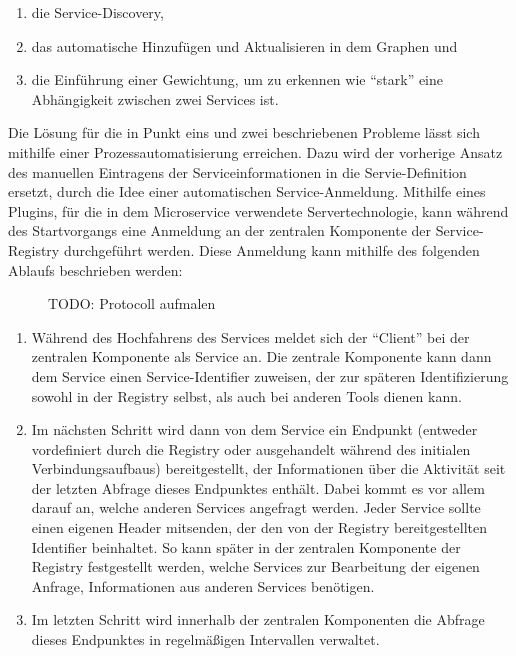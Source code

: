 \begin{enumerate}
	\item die Service-Discovery,
	\item das automatische Hinzufügen und Aktualisieren in dem Graphen und
	\item die Einführung einer Gewichtung, um zu erkennen wie \enquote{stark} eine Abhängigkeit zwischen zwei Services ist.
\end{enumerate}

Die Lösung für die in Punkt eins und zwei beschriebenen Probleme lässt sich mithilfe einer Prozessautomatisierung erreichen. Dazu wird der vorherige Ansatz des manuellen Eintragens der Serviceinformationen in die Servie-Definition ersetzt, durch die Idee einer automatischen Service-Anmeldung. Mithilfe eines Plugins, für die in dem Microservice verwendete Servertechnologie, kann während des Startvorgangs eine Anmeldung an der zentralen Komponente der Service-Registry durchgeführt werden. Diese Anmeldung kann mithilfe des folgenden Ablaufs beschrieben werden:

\begin{figure}[h]
	\centering
	
	\caption{TODO: Protocoll aufmalen}
\end{figure}

\begin{enumerate}
	\item Während des Hochfahrens des Services meldet sich der \enquote{Client} bei der zentralen Komponente als Service an. Die zentrale Komponente kann dann dem Service einen Service-Identifier zuweisen, der zur späteren Identifizierung sowohl in der Registry selbst, als auch bei anderen Tools dienen kann.
	\item Im nächsten Schritt wird dann von dem Service ein Endpunkt (entweder vordefiniert durch die Registry oder ausgehandelt während des initialen Verbindungsaufbaus) bereitgestellt, der Informationen über die Aktivität seit der letzten Abfrage dieses Endpunktes enthält. Dabei kommt es vor allem darauf an, welche anderen Services angefragt werden. Jeder Service sollte einen eigenen Header mitsenden, der den von der Registry bereitgestellten Identifier beinhaltet. So kann später in der zentralen Komponente der Registry festgestellt werden, welche Services zur Bearbeitung der eigenen Anfrage, Informationen aus anderen Services benötigen.
	\item Im letzten Schritt wird innerhalb der zentralen Komponenten die Abfrage dieses Endpunktes in regelmäßigen Intervallen verwaltet.
\end{enumerate}


